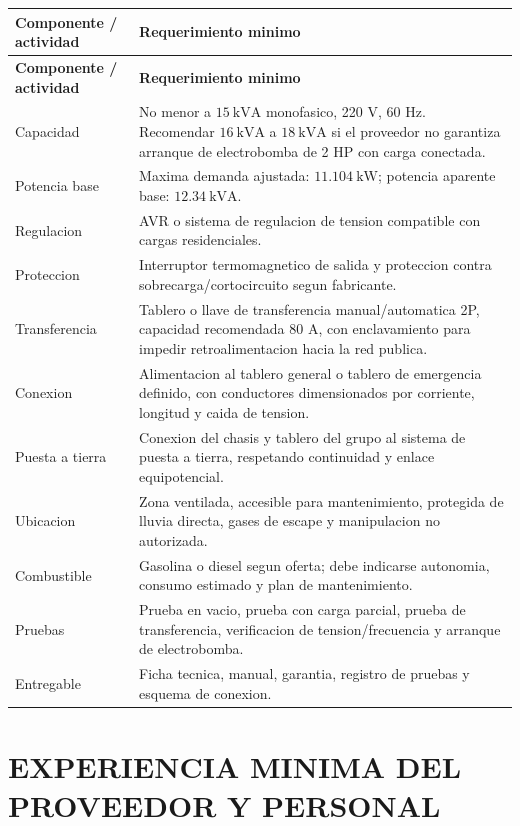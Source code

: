 \documentclass[12pt,letterpaper]{report}
\newcommand{\reqheader}{\rowcolor{modelblue!14}}
\begin{document}
\begin{longtable}{P{0.30\textwidth} P{0.62\textwidth}}
\toprule
\reqheader \textbf{Componente / actividad} & \textbf{Requerimiento minimo} \\
\midrule
\endfirsthead
\toprule
\reqheader \textbf{Componente / actividad} & \textbf{Requerimiento minimo} \\
\midrule
\endhead
Capacidad & No menor a \(15\ \text{kVA}\) monofasico, 220 V, 60 Hz. Recomendar \(16\ \text{kVA}\) a \(18\ \text{kVA}\) si el proveedor no garantiza arranque de electrobomba de 2 HP con carga conectada. \\
Potencia base & Maxima demanda ajustada: \(11.104\ \text{kW}\); potencia aparente base: \(12.34\ \text{kVA}\). \\
Regulacion & AVR o sistema de regulacion de tension compatible con cargas residenciales. \\
Proteccion & Interruptor termomagnetico de salida y proteccion contra sobrecarga/cortocircuito segun fabricante. \\
Transferencia & Tablero o llave de transferencia manual/automatica 2P, capacidad recomendada 80 A, con enclavamiento para impedir retroalimentacion hacia la red publica. \\
Conexion & Alimentacion al tablero general o tablero de emergencia definido, con conductores dimensionados por corriente, longitud y caida de tension. \\
Puesta a tierra & Conexion del chasis y tablero del grupo al sistema de puesta a tierra, respetando continuidad y enlace equipotencial. \\
Ubicacion & Zona ventilada, accesible para mantenimiento, protegida de lluvia directa, gases de escape y manipulacion no autorizada. \\
Combustible & Gasolina o diesel segun oferta; debe indicarse autonomia, consumo estimado y plan de mantenimiento. \\
Pruebas & Prueba en vacio, prueba con carga parcial, prueba de transferencia, verificacion de tension/frecuencia y arranque de electrobomba. \\
Entregable & Ficha tecnica, manual, garantia, registro de pruebas y esquema de conexion. \\
\bottomrule
\end{longtable}

\section{EXPERIENCIA MINIMA DEL PROVEEDOR Y PERSONAL}
\end{document}
